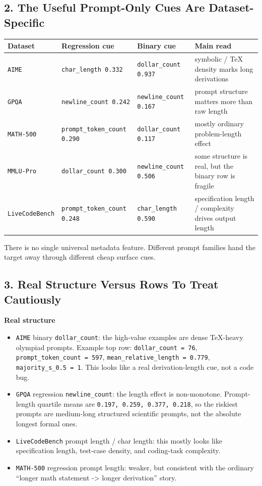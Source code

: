 \documentclass[11pt]{article}
\begin{document}
\subsection*{2. The Useful Prompt-Only Cues Are Dataset-Specific}
\begin{center}
\small
\begin{tabular}{@{}>{\raggedright\arraybackslash}p{1.0in}>{\raggedright\arraybackslash}p{1.65in}>{\raggedright\arraybackslash}p{1.55in}>{\raggedright\arraybackslash}p{2.0in}@{}}
\toprule
Dataset & Regression cue & Binary cue & Main read \\
\midrule
\texttt{AIME} & \texttt{char\_length 0.332} & \texttt{dollar\_count 0.937} & symbolic / TeX density marks long derivations \\
\texttt{GPQA} & \texttt{newline\_count 0.242} & \texttt{newline\_count 0.167} & prompt structure matters more than raw length \\
\texttt{MATH-500} & \texttt{prompt\_token\_count 0.290} & \texttt{dollar\_count 0.117} & mostly ordinary problem-length effect \\
\texttt{MMLU-Pro} & \texttt{dollar\_count 0.300} & \texttt{newline\_count 0.506} & some structure is real, but the binary row is fragile \\
\texttt{LiveCodeBench} & \texttt{prompt\_token\_count 0.248} & \texttt{char\_length 0.590} & specification length / complexity drives output length \\
\bottomrule
\end{tabular}
\end{center}

There is no single universal metadata feature. Different prompt families hand the target away through different cheap surface cues.

\subsection*{3. Real Structure Versus Rows To Treat Cautiously}
\textbf{Real structure}
\begin{itemize}[leftmargin=1.5em]
\item \texttt{AIME} binary \texttt{dollar\_count}: the high-value examples are dense TeX-heavy olympiad prompts. Example top row: \texttt{dollar\_count = 76}, \texttt{prompt\_token\_count = 597}, \texttt{mean\_relative\_length = 0.779}, \texttt{majority\_s\_0.5 = 1}. This looks like a real derivation-length cue, not a code bug.
\item \texttt{GPQA} regression \texttt{newline\_count}: the length effect is non-monotone. Prompt-length quartile means are \texttt{0.197, 0.259, 0.377, 0.218}, so the riskiest prompts are medium-long structured scientific prompts, not the absolute longest formal ones.
\item \texttt{LiveCodeBench} prompt length / char length: this mostly looks like specification length, test-case density, and coding-task complexity.
\item \texttt{MATH-500} regression prompt length: weaker, but consistent with the ordinary ``longer math statement -> longer derivation'' story.
\end{itemize}
\end{document}
